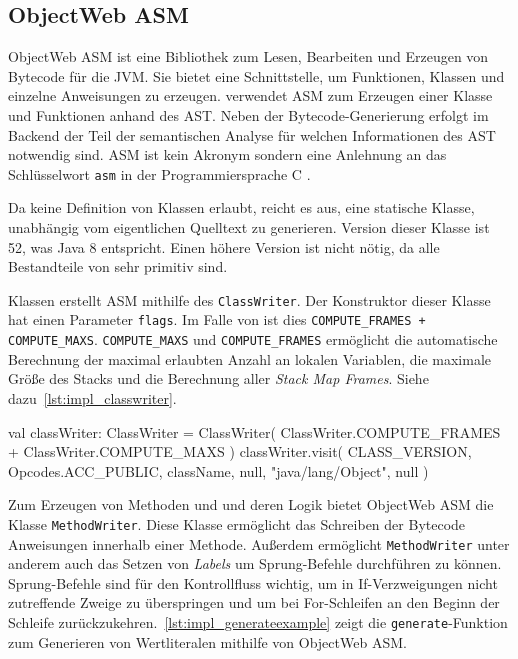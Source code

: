 \subsection{ObjectWeb ASM}

ObjectWeb ASM ist eine Bibliothek zum Lesen, Bearbeiten und Erzeugen von Bytecode für die JVM. Sie bietet eine Schnittstelle, um Funktionen, Klassen und einzelne Anweisungen zu erzeugen. \Toya verwendet ASM zum Erzeugen einer Klasse und Funktionen anhand des AST. Neben der Bytecode-Generierung erfolgt im Backend der Teil der semantischen Analyse für welchen Informationen des AST notwendig sind. ASM ist kein Akronym sondern eine Anlehnung an das Schlüsselwort \texttt{asm} in der Programmiersprache C \parencite{bruneton2002asm}.

Da \toya keine Definition von Klassen erlaubt, reicht es aus, eine statische Klasse, unabhängig vom eigentlichen Quelltext zu generieren. Version dieser Klasse ist 52, was Java 8 entspricht. Einen höhere Version ist nicht nötig, da alle Bestandteile von \toya sehr primitiv sind.

Klassen erstellt ASM mithilfe des \texttt{ClassWriter}. Der Konstruktor dieser Klasse hat einen Parameter \texttt{flags}. Im Falle von \toya ist dies \texttt{COMPUTE\_FRAMES + COMPUTE\_MAXS}. \texttt{COMPUTE\_MAXS} und \texttt{COMPUTE\_FRAMES} ermöglicht die automatische Berechnung der maximal erlaubten Anzahl an lokalen Variablen, die maximale Größe des Stacks und die Berechnung aller \textit{Stack Map Frames}. Siehe dazu~\autoref{lst:impl_classwriter}.

\begin{KotlinCode}[numbers=none, caption={Erstellung einer Klasse mithilfe ObjectWeb ASM}, label=lst:impl_classwriter]
val classWriter: ClassWriter = ClassWriter(
    ClassWriter.COMPUTE_FRAMES + ClassWriter.COMPUTE_MAXS
)
classWriter.visit(
    CLASS_VERSION,
    Opcodes.ACC_PUBLIC,
    className,
    null,
    "java/lang/Object",
    null
)
\end{KotlinCode}

Zum Erzeugen von Methoden und und deren Logik bietet ObjectWeb ASM die Klasse \texttt{MethodWriter}. Diese Klasse ermöglicht das Schreiben der Bytecode Anweisungen innerhalb einer Methode. Außerdem ermöglicht \texttt{MethodWriter} unter anderem auch das Setzen von \textit{Labels} um Sprung-Befehle durchführen zu können. Sprung-Befehle sind für den Kontrollfluss wichtig, um in If-Verzweigungen nicht zutreffende Zweige zu überspringen und um bei For-Schleifen an den Beginn der Schleife zurückzukehren.~\autoref{lst:impl_generateexample} zeigt die \texttt{generate}-Funktion zum Generieren von Wertliteralen mithilfe von ObjectWeb ASM.

